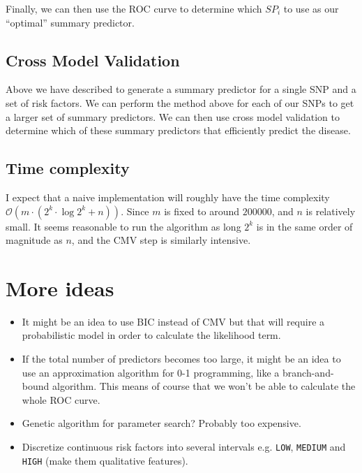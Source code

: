 \documentclass[a4paper]{article}
\begin{document}
Finally, we can then use the ROC curve to determine which $SP_i$ to use as our ``optimal'' summary predictor.
\subsection{Cross Model Validation}
Above we have described to generate a summary predictor for a single SNP and a set of risk factors. We can perform the method above for each of our SNPs to get a larger set of summary predictors. We can then use cross model validation to determine which of these summary predictors that efficiently predict the disease.

\subsection{Time complexity}
I expect that a naive implementation will roughly have the time complexity $\mathcal{O}(m \cdot (2^k\cdot \log{2^k} + n))$. Since $m$ is fixed to around $200 000$, and $n$ is relatively small. It seems reasonable to run the algorithm as long $2^k$ is in the same order of magnitude as $n$, and the CMV step is similarly intensive.

\section{More ideas}
\begin{itemize}
  \item It might be an idea to use BIC instead of CMV but that will require a probabilistic model in order to calculate the likelihood term.
  \item If the total number of predictors becomes too large, it might be an idea to use an approximation algorithm for 0-1 programming, like a branch-and-bound algorithm. This means of course that we won't be able to calculate the whole ROC curve.
  \item Genetic algorithm for parameter search? Probably too expensive.
  \item Discretize continuous risk factors into several intervals e.g. \texttt{LOW}, \texttt{MEDIUM} and \texttt{HIGH} (make them qualitative features).
\end{itemize}
\end{document}
